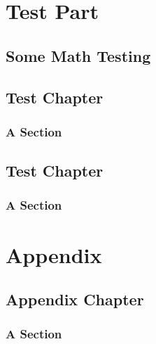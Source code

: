 \documentclass[11pt,paper=a5,footinclude=true,headinclude=true]{scrbook} %
\begin{document}

    \tableofcontents


    \cleardoublepage\part{Test Part}
    \chapter{Some Math Testing}
    \lipsum[1]

    \chapter{Test Chapter}
    \lipsum[1]

    \section{A Section}
    \lipsum[1]

    \chapter{Test Chapter}
    \lipsum[1]

    \section{A Section}
    \lipsum[1]

%   

    \appendix
    \cleardoublepage\part{Appendix}
    \chapter{Appendix Chapter}
    \lipsum[1]

    \section{A Section}
    \lipsum[1]
\end{document}
